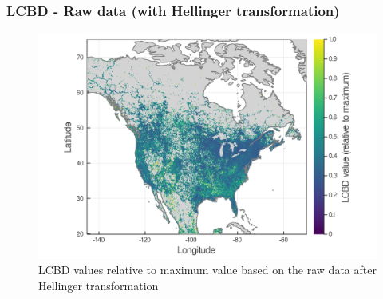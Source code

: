 \documentclass[10pt, aspectratio=1610]{beamer}
\begin{document}
\begin{frame}
  \frametitle{LCBD - Raw data (with Hellinger transformation)}
  \begin{figure}
    \centering
    \hspace*{-0cm}\includegraphics[scale=0.17]{fig/05_raw_lcbd-transf.png}
    \caption{LCBD values relative to maximum value based on the raw data after Hellinger transformation}
  \end{figure}
\end{frame}
\end{document}
